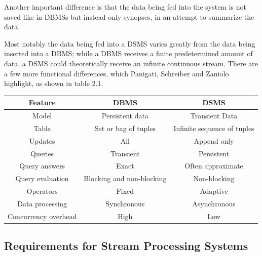         Another important difference is that the data being fed into the system is not saved like in DBMSs but instead only synopses, in 
        an attempt to summarize the data.
        
        Most notably the data being fed into a DSMS varies greatly from the data being inserted into a DBMS; while a DBMS receives a finite predetermined amount 
        of data, a DSMS could theoretically receive an infinite continuous stream.
        There are a few more functional differences, which Panigati, Schreiber and Zaniolo highlight, as shown in table 2.1.

        \begin{table}[h]
            \centering
            \label{tab:dbms-dsms}
            \begin{tabular}{|c|c|c|} \hline
                \textbf{Feature} & \textbf{DBMS} & \textbf{DSMS} \\ \hline
                Model & Persistent data & Transient Data \\ \hline
                Table & Set or bag of tuples & Infinite sequence of tuples \\ \hline
                Updates & All & Append only \\ \hline
                Queries & Transient & Persistent \\ \hline
                Query answers & Exact & Often approximate \\ \hline
                Query evaluation & Blocking and non-blocking & Non-blocking \\ \hline
                Operators & Fixed & Adaptive \\ \hline
                Data processing & Synchronous & Asynchronous \\ \hline
                Concurrency overhead  & High & Low \\ \hline
            \end{tabular}
        \end{table}

        \subsection{Requirements for Stream Processing Systems}
        \label{sub:requirements}


